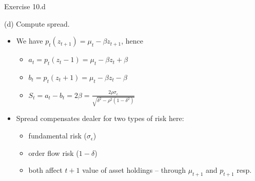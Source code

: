 \documentclass[english,10pt
,aspectratio=169
]{beamer}
\begin{document}
\begin{frame}{Exercise 10.d}
	\begin{exampleblock}{}
		(d) Compute spread.
	\end{exampleblock}
	
	\pause
	\begin{itemize}
		\item We have $p_t(z_{t+1}) = \mu_t - \beta z_{t+1}$, hence
		\begin{itemize}
			\item $a_t = p_t(z_t - 1) = \mu_t - \beta z_t + \beta$
			\item $b_t = p_t(z_t + 1) = \mu_t - \beta z_t - \beta$
			\item $S_t = a_t - b_t = 2\beta = \frac{2 \rho \sigma_\epsilon}{\sqrt{\delta^2 - \rho^2(1-\delta^2)}}$
		\end{itemize}
		\item Spread compensates dealer for two types of risk here:
		\begin{itemize}
			\item fundamental risk ($\sigma_\epsilon$)
			\item order flow risk ($1-\delta$)
			\item both affect $t+1$ value of asset holdings -- through $\mu_{t+1}$ and $p_{t+1}$ resp.
		\end{itemize}
	\end{itemize}
\end{frame}
\end{document}
